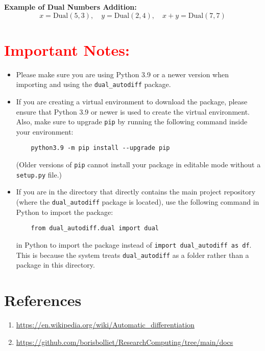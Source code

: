 \documentclass[a4paper,12pt]{article}
\begin{document}
\textbf{Example of Dual Numbers Addition:}
\[
x = \text{Dual}(5, 3), \quad y = \text{Dual}(2, 4), \quad x + y = \text{Dual}(7, 7)
\]
\section{\textcolor{red}{Important Notes:}}

\begin{itemize}
    \item Please make sure you are using Python 3.9 or a newer version when importing and using the \texttt{dual\_autodiff} package.
    
    \item If you are creating a virtual environment to download the package, please ensure that Python 3.9 or newer is used to create the virtual environment. Also, make sure to upgrade \texttt{pip} by running the following command inside your environment:
    \begin{verbatim}
    python3.9 -m pip install --upgrade pip
    \end{verbatim}
    (Older versions of \texttt{pip} cannot install your package in editable mode without a \texttt{setup.py} file.)
    
    \item If you are in the directory that directly contains the main project repository (where the \texttt{dual\_autodiff} package is located), use the following command in Python to import the package:
    \begin{verbatim}
    from dual_autodiff.dual import dual
    \end{verbatim}
    in Python to import the package instead of \texttt{import dual\_autodiff as df}. This is because the system treats \texttt{dual\_autodiff} as a folder rather than a package in this directory.
\end{itemize}

\section{References}
\begin{enumerate}
    \item \url{https://en.wikipedia.org/wiki/Automatic_differentiation}
    \item \url{https://github.com/borisbolliet/ResearchComputing/tree/main/docs}
\end{enumerate}
\end{document}
